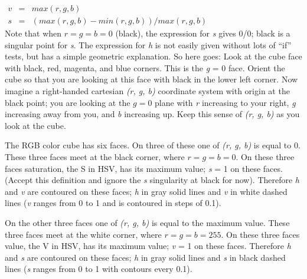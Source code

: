 \( \begin{array}{ccl} 

v &	=	&	max (r, g, b)	\\
s &	=	&	(max (r, g, b) - min (r, g, b)) / max (r, g, b)
\end{array} \) \\

Note that when $r = g = b = 0$ (black), the expression for {\it s}
gives 0/0; black is a singular point for {\it s}.  The expression
for {\it h} is not easily given without lots of ``if'' tests, but
has a simple geometric explanation.  So here goes: Look at the
cube face with black, red, magenta, and blue corners.
This is the {\it g} = 0 face.  Orient the cube so that you are
looking at this face with black in the lower left corner.  Now
imagine a right-handed cartesian {\it (r, g, b)} coordinate system
with origin at the black point; you are looking at the $g = 0$
plane with {\it r} increasing to your right, {\it g} increasing
away from you, and {\it b} increasing up.  Keep this sense of
{\it (r, g, b)} as you look at the cube.

The RGB color cube has six faces.  On three of these one of
{\it (r, g, b)} is equal to 0.  These three faces meet at the
black corner, where $r = g = b = 0$.  On these three faces
saturation, the S in HSV, has its maximum value; {\it s} = 1
on these faces.  (Accept this definition and ignore the {\it s}
singularity at black for now).  Therefore {\it h} and {\it v} are
contoured on these faces; {\it h} in gray solid lines and {\it v}
in white dashed lines ({\it v} ranges from 0 to 1 and is contoured
in steps of 0.1).

On the other three faces one of {\it (r, g, b)} is equal to the
maximum value.  These three faces meet at the white corner, where
$r = g = b = 255$.  On these three faces value, the V in HSV, has
its maximum value; {\it v} = 1 on these faces.  Therefore {\it h}
and {\it s} are contoured on these faces; {\it h} in gray solid
lines and {\it s} in black dashed lines ({\it s} ranges from 0 to
1 with contours every 0.1).

